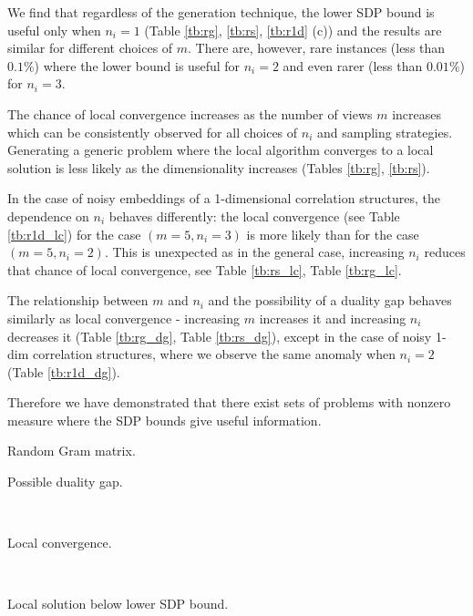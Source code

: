 We find that regardless of the generation technique, the lower
SDP bound is useful only when $n_i = 1$ (Table \ref{tb:rg},
\ref{tb:rs}, \ref{tb:r1d} (c)) and the results are similar for
different choices of $m$. There are, however, rare instances (less
than $0.1\%$) where the lower bound is useful for $n_i = 2$ and
even rarer (less than $0.01\%$) for $n_i = 3$.

The chance of local convergence increases as the number of views
$m$ increases which can be consistently observed for all choices
of $n_i$ and sampling strategies. Generating a generic problem where the
local algorithm  converges to a local solution is less
likely as the dimensionality increases
(Tables \ref{tb:rg}, \ref{tb:rs}).

In the case of noisy embeddings of a 1-dimensional correlation structures, the dependence on $n_i$
behaves differently: the local convergence (see Table \ref{tb:r1d_lc}) for the
case $\left(m=5, n_i=3\right)$ is more likely than for the
case $\left(m=5, n_i =2\right)$. This is unexpected as in the general case,
increasing $n_i$ reduces that chance of local convergence,
see Table \ref{tb:rs_lc}, Table \ref{tb:rg_lc}.

The relationship between $m$ and $n_i$ and the possibility of a
duality gap behaves similarly as local convergence -
increasing $m$ increases it and increasing $n_i$ decreases it (Table \ref{tb:rg_dg}, Table \ref{tb:rs_dg}),
except in the case of noisy 1-dim correlation structures, where
we observe the same anomaly when $n_i = 2$ (Table \ref{tb:r1d_dg}).

Therefore we have demonstrated that there exist sets of problems with nonzero
measure where the SDP bounds give useful information.

\begin{table}[t]
\caption{Random Gram matrix.}
    \begin{subtable}[t]{.5\textwidth}
        \centering
        \caption{Possible duality gap.}
        
        \label{tb:rg_dg}
    \end{subtable}
    ~
    \begin{subtable}[t]{.5\textwidth}
        \centering
        \caption{Local convergence.}
        
        \label{tb:rg_lc}
    \end{subtable}
    ~
    \begin{subtable}[t]{\textwidth}
        \centering
        \caption{Local solution below lower SDP bound.}
        
        \label{tb:rg_lb}
    \end{subtable}
  \label{tb:rg}
\end{table}

